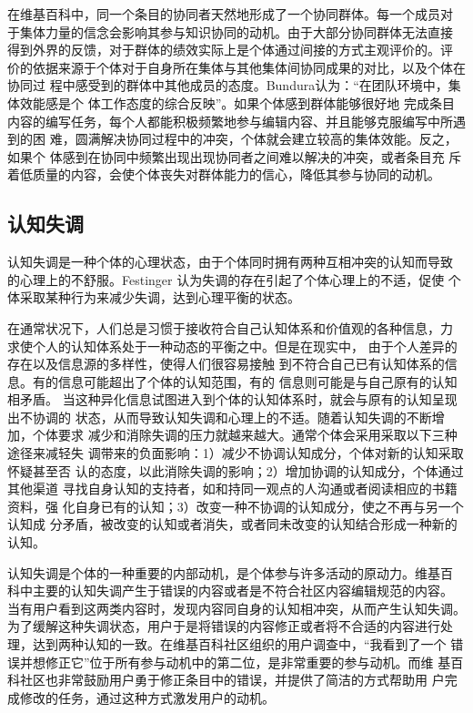 在维基百科中，同一个条目的协同者天然地形成了一个协同群体。每一个成员对
于集体力量的信念会影响其参与知识协同的动机。由于大部分协同群体无法直接
得到外界的反馈，对于群体的绩效实际上是个体通过间接的方式主观评价的。评
价的依据来源于个体对于自身所在集体与其他集体间协同成果的对比，以及个体在协同过
程中感受到的群体中其他成员的态度。Bundura认为：“在团队环境中，集体效能感是个
体工作态度的综合反映”\cite{bundura}。如果个体感到群体能够很好地
完成条目内容的编写任务，每个人都能积极频繁地参与编辑内容、并且能够克服编写中所遇到的困
难，圆满解决协同过程中的冲突，个体就会建立较高的集体效能。反之，如果个
体感到在协同中频繁出现出现协同者之间难以解决的冲突，或者条目充
斥着低质量的内容，会使个体丧失对群体能力的信心，降低其参与协同的动机。

\subsection{认知失调}
\label{sec:cognitive-dissonance}
认知失调是一种个体的心理状态，由于个体同时拥有两种互相冲突的认知而导致
的心理上的不舒服。Festinger 认为失调的存在引起了个体心理上的不适，促使
个体采取某种行为来减少失调，达到心理平衡的状态。

在通常状况下，人们总是习惯于接收符合自己认知体系和价值观的各种信息，力
求使个人的认知体系处于一种动态的平衡之中。但是在现实中，
由于个人差异的存在以及信息源的多样性，使得人们很容易接触
到不符合自己已有认知体系的信息。有的信息可能超出了个体的认知范围，有的
信息则可能是与自己原有的认知相矛盾。
当这种异化信息试图进入到个体的认知体系时，就会与原有的认知呈现出不协调的
状态，从而导致认知失调和心理上的不适。随着认知失调的不断增加，个体要求
减少和消除失调的压力就越来越大。通常个体会采用采取以下三种途径来减轻失
调带来的负面影响：1）减少不协调认知成分，个体对新的认知采取怀疑甚至否
认的态度，以此消除失调的影响；2）增加协调的认知成分，个体通过其他渠道
寻找自身认知的支持者，如和持同一观点的人沟通或者阅读相应的书籍资料，强
化自身已有的认知；3）改变一种不协调的认知成分，使之不再与另一个认知成
分矛盾，被改变的认知或者消失，或者同未改变的认知结合形成一种新的认知。 

认知失调是个体的一种重要的内部动机，是个体参与许多活动的原动力。维基百
科中主要的认知失调产生于错误的内容或者是不符合社区内容编辑规范的内容。
当有用户看到这两类内容时，发现内容同自身的认知相冲突，从而产生认知失调。
为了缓解这种失调状态，用户于是将错误的内容修正或者将不合适的内容进行处
理，达到两种认知的一致。在维基百科社区组织的用户调查中，“我看到了一个
错误并想修正它”位于所有参与动机中的第二位，是非常重要的参与动机。而维
基百科社区也非常鼓励用户勇于修正条目中的错误，并提供了简洁的方式帮助用
户完成修改的任务，通过这种方式激发用户的动机。

